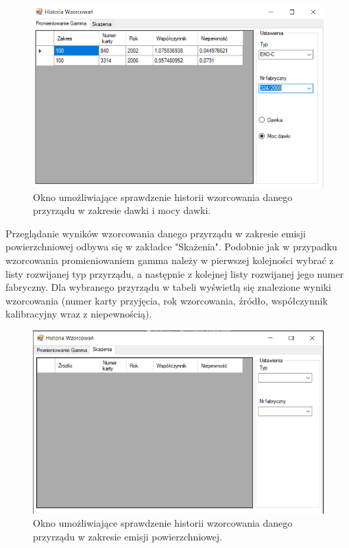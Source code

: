 \begin{figure}[htb]
	\centering
	\includegraphics{obrazki/Wyszukiwanie/historia_wzorcowan_moc.png}
	\caption{Okno umożliwiające sprawdzenie historii wzorcowania danego przyrządu w zakresie dawki i mocy dawki.}
	\label{historiaWzorcowanMoc}
\end{figure}

Przeglądanie wyników wzorcowania danego przyrządu w zakresie emisji powierzchniowej odbywa się w zakładce "Skażenia". Podobnie jak w przypadku wzorcowania promieniowaniem gamma należy w pierwszej kolejności wybrać z listy rozwijanej typ przyrządu, a następnie z kolejnej listy rozwijanej jego numer fabryczny. Dla wybranego przyrządu w tabeli wyświetlą się znalezione wyniki wzorcowania (numer karty przyjęcia, rok wzorcowania, źródło, współczynnik kalibracyjny wraz z niepewnością).

\begin{figure}[htb]
	\centering
	\includegraphics{obrazki/Wyszukiwanie/historia_wzorcowan_skazenia.png}
	\caption{Okno umożliwiające sprawdzenie historii wzorcowania danego przyrządu w zakresie emisji powierzchniowej.}
	\label{historiaWzorcowanSkazenia}
\end{figure}